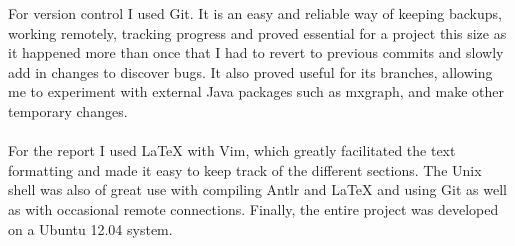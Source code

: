 \documentclass{report}
\begin{document}
For version control I used Git\cite{progit}. It is an easy and reliable way of 
keeping backups, working remotely, tracking progress and proved essential for a 
project this size as it happened more than once that I had to revert to previous 
commits and slowly add in changes to discover bugs. It also proved useful for 
its branches, allowing me to experiment with external Java packages such as 
mxgraph, and make other temporary changes.
\\ \\
For the report I used LaTeX\cite{latex} with Vim, which greatly facilitated the 
text formatting and made it easy to keep track of the different sections. The 
Unix shell was also of great use with compiling Antlr and LaTeX and using 
Git as well as with occasional remote connections. Finally, the entire project 
was developed on a Ubuntu 12.04 system.
\end{document}
